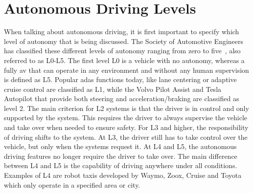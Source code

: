 
\section{Autonomous Driving Levels}
\label{sec:intro_ad}
When talking about autonomous driving, it is first important to specify which level of autonomy that is being discussed. The Society of Automotive Engineers has classified these different levels of autonomy ranging from zero to five~\cite{SAE2021}, also referred to as L0-L5. The first level L0 is a vehicle with no autonomy, whereas a fully \gls{av} that can operate in any environment and without any human supervision is defined as L5. Popular \gls{adas} functions today, like lane centering or adaptive cruise control are classified as L1, while the Volvo Pilot Assist and Tesla Autopilot that provide both steering and acceleration/braking are classified as level 2. The main criterion for L2 systems is that the driver is in control and only supported by the system. 
This requires the driver to always supervise the vehicle and take over when needed to ensure safety. For L3 and higher, the responsibility of driving shifts to the system. At L3, the driver still has to take control over the vehicle, but only when the systems request it. At L4 and L5, the autonomous driving features no longer require the driver to take over. The main difference between L4 and L5 is the capability of driving anywhere under all conditions. Examples of L4 are robot taxis developed by Waymo, Zoox, Cruise and Toyota which only operate in a specified area or city. 

